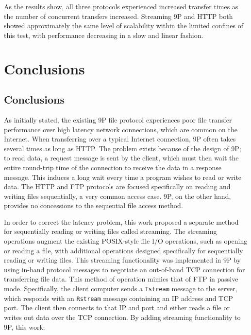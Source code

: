 \documentclass[11pt,american]{report}
\begin{document}
As the results show, all three protocols experienced increased transfer times as the number of concurrent transfers increased. Streaming 9P and HTTP both showed approximately the same level of scalability within the limited confines of this test, with performance decreasing in a slow and linear fashion.


\chapter{Conclusions}

\section{Conclusions}
As initially stated, the existing 9P file protocol experiences poor file transfer performance over high latency network connections, which are common on the Internet. When transferring over a typical Internet connection, 9P often takes several times as long as HTTP. The problem exists because of the design of 9P; to read data, a request message is sent by the client, which must then wait the entire round-trip time of the connection to receive the data in a response message. This induces a long wait every time a program wishes to read or write data. The HTTP and FTP protocols are focused specifically on reading and writing files sequentially, a very common access case. 9P, on the other hand, provides no concessions to the sequential file access method.

In order to correct the latency problem, this work proposed a separate method for sequentially reading or writing files called streaming. The streaming operations augment the existing POSIX-style file I/O operations, such as opening or reading a file, with additional operations designed specifically for sequentially reading or writing files. This streaming functionality was implemented in 9P by using in-band protocol messages to negotiate an out-of-band TCP connection for transferring file data. This method of operation mimics that of FTP in passive mode. Specifically, the client computer sends a {\tt Tstream} message to the server, which responds with an {\tt Rstream} message containing an IP address and TCP port. The client then connects to that IP and port and either reads a file or writes out data over the TCP connection. By adding streaming functionality to 9P, this work:
\end{document}
